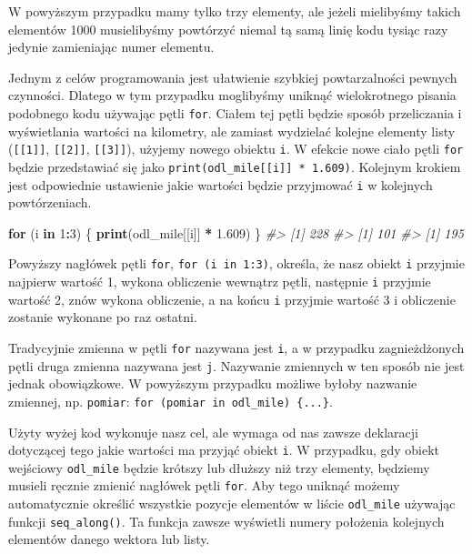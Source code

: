 \documentclass[paper=6in:9in,pagesize=pdftex,headinclude=on,footinclude=on,10pt]{scrbook}
\makeatletter
\newenvironment{Shaded}{\begin{snugshade}}{\end{snugshade}}
\newcommand{\CommentTok}[1]{\textcolor[rgb]{0.56,0.35,0.01}{\textit{#1}}}
\newcommand{\ControlFlowTok}[1]{\textcolor[rgb]{0.13,0.29,0.53}{\textbf{#1}}}
\newcommand{\DecValTok}[1]{\textcolor[rgb]{0.00,0.00,0.81}{#1}}
\newcommand{\FloatTok}[1]{\textcolor[rgb]{0.00,0.00,0.81}{#1}}
\newcommand{\KeywordTok}[1]{\textcolor[rgb]{0.13,0.29,0.53}{\textbf{#1}}}
\newcommand{\NormalTok}[1]{#1}
\newcommand{\OperatorTok}[1]{\textcolor[rgb]{0.81,0.36,0.00}{\textbf{#1}}}
\newcommand{\StringTok}[1]{\textcolor[rgb]{0.31,0.60,0.02}{#1}}
\newenvironment{kframe}{%
\medskip{}
\setlength{\fboxsep}{.8em}
 \def\at@end@of@kframe{}%
 \ifinner\ifhmode%
  \def\at@end@of@kframe{\end{minipage}}%
  \begin{minipage}{\columnwidth}%
 \fi\fi%
 \def\FrameCommand##1{\hskip\@totalleftmargin \hskip-\fboxsep
 \colorbox{shadecolor}{##1}\hskip-\fboxsep
     \hskip-\linewidth \hskip-\@totalleftmargin \hskip\columnwidth}%
 \MakeFramed {\advance\hsize-\width
   \@totalleftmargin\z@ \linewidth\hsize
   \@setminipage}}%
 {\par\unskip\endMakeFramed%
 \at@end@of@kframe}
\newenvironment{rmdblock}[1]
  {
  \begin{itemize}
  \renewcommand{\labelitemi}{
    \raisebox{-.7\height}[0pt][0pt]{
      {\setkeys{Gin}{width=3em,keepaspectratio}\texttt{[image: images/\#1]}}
    }
  }
  \setlength{\fboxsep}{1em}
  \begin{kframe}
  \item
  }
  {
  \end{kframe}
  \end{itemize}
  }
\newenvironment{rmdinfo}
  {\begin{rmdblock}{compass}}
  {\end{rmdblock}}
\makeatother
\begin{document}
W powyższym przypadku mamy tylko trzy elementy, ale jeżeli mielibyśmy takich elementów 1000 musielibyśmy powtórzyć niemal tą samą linię kodu tysiąc razy jedynie zamieniając numer elementu.

Jednym z celów programowania jest ułatwienie szybkiej powtarzalności pewnych czynności.
Dlatego w tym przypadku moglibyśmy uniknąć wielokrotnego pisania podobnego kodu używając pętli \texttt{for}.
Ciałem tej pętli będzie sposób przeliczania i wyświetlania wartości na kilometry, ale zamiast wydzielać kolejne elementy listy (\texttt{{[}{[}1{]}{]}}, \texttt{{[}{[}2{]}{]}}, \texttt{{[}{[}3{]}{]}}), użyjemy nowego obiektu \texttt{i}.
W efekcie nowe ciało pętli \texttt{for} będzie przedstawiać się jako \texttt{print(odl\_mile{[}{[}i{]}{]}\ *\ 1.609)}.
Kolejnym krokiem jest odpowiednie ustawienie jakie wartości będzie przyjmować \texttt{i} w kolejnych powtórzeniach.

\begin{Shaded}
\begin{Highlighting}[]
\ControlFlowTok{for}\NormalTok{ (i }\ControlFlowTok{in} \DecValTok{1}\OperatorTok{:}\DecValTok{3}\NormalTok{) \{}
  \KeywordTok{print}\NormalTok{(odl_mile[[i]] }\OperatorTok{*}\StringTok{ }\FloatTok{1.609}\NormalTok{)}
\NormalTok{\}}
\CommentTok{#> [1] 228}
\CommentTok{#> [1] 101}
\CommentTok{#> [1] 195}
\end{Highlighting}
\end{Shaded}

Powyższy nagłówek pętli \texttt{for}, \texttt{for\ (i\ in\ 1:3)}, określa, że nasz obiekt \texttt{i} przyjmie najpierw wartość 1, wykona obliczenie wewnątrz pętli, następnie \texttt{i} przyjmie wartość 2, znów wykona obliczenie, a na końcu \texttt{i} przyjmie wartość 3 i obliczenie zostanie wykonane po raz ostatni.

\begin{rmdinfo}
Tradycyjnie zmienna w pętli \texttt{for} nazywana jest \texttt{i}, a w przypadku zagnieżdżonych pętli druga zmienna nazywana jest \texttt{j}.
Nazywanie zmiennych w ten sposób nie jest jednak obowiązkowe.
W powyższym przypadku możliwe byłoby nazwanie zmiennej, np. \texttt{pomiar}: \texttt{for\ (pomiar\ in\ odl\_mile)\ \{...\}}.
\end{rmdinfo}

Użyty wyżej kod wykonuje nasz cel, ale wymaga od nas zawsze deklaracji dotyczącej tego jakie wartości ma przyjąć obiekt \texttt{i}.
W przypadku, gdy obiekt wejściowy \texttt{odl\_mile} będzie krótszy lub dłuższy niż trzy elementy, będziemy musieli ręcznie zmienić nagłówek pętli \texttt{for}.
Aby tego uniknąć możemy automatycznie określić wszystkie pozycje elementów w liście \texttt{odl\_mile} używając funkcji \texttt{seq\_along()}.
Ta funkcja zawsze wyświetli numery położenia kolejnych elementów danego wektora lub listy.
\end{document}
